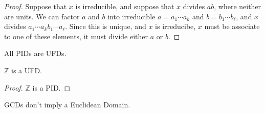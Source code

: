 \begin{proof}
Suppose that $x$ is irreducible, and suppose that $x$ divides $ab$, where neither are units. We can factor $a$ and $b$ into irreducible $a = a_1 \cdots a_k$ and $b = b_1 \cdots b_\ell$, and $x$ divides $a_1 \cdots a_k b_1 \cdots a_\ell$. Since this is unique, and $x$ is irreducibe, $x$ must be associate to one of these elements, it must divide either $a$ or $b$.
\end{proof}

\begin{proposition}
All PIDs are UFDs.
\end{proposition}

\begin{proposition}
$\mathbb{Z}$ is a UFD.
\end{proposition}

\begin{proof}
$\mathbb{Z}$ is a PID.
\end{proof}

\begin{proposition}
GCDs don't imply a Euclidean Domain.
\end{proposition}